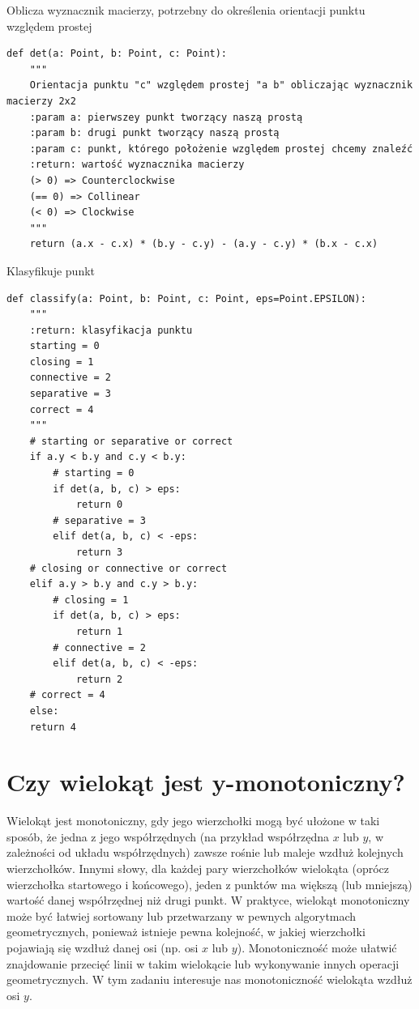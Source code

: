 \documentclass[12pt]{article}
\begin{document}
\newpage

\mbox{}
\par Oblicza wyznacznik macierzy, potrzebny do określenia orientacji punktu względem prostej
\begin{Verbatim}
def det(a: Point, b: Point, c: Point):
	"""
	Orientacja punktu "c" względem prostej "a b" obliczając wyznacznik macierzy 2x2
	:param a: pierwszey punkt tworzący naszą prostą
	:param b: drugi punkt tworzący naszą prostą
	:param c: punkt, którego położenie względem prostej chcemy znaleźć
	:return: wartość wyznacznika macierzy
	(> 0) => Counterclockwise
	(== 0) => Collinear
	(< 0) => Clockwise
	"""
	return (a.x - c.x) * (b.y - c.y) - (a.y - c.y) * (b.x - c.x)
\end{Verbatim}

\mbox{}
\par Klasyfikuje punkt
\begin{Verbatim}
def classify(a: Point, b: Point, c: Point, eps=Point.EPSILON):
	"""
	:return: klasyfikacja punktu
	starting = 0
	closing = 1
	connective = 2
	separative = 3
	correct = 4
	"""
	# starting or separative or correct
	if a.y < b.y and c.y < b.y:
		# starting = 0
		if det(a, b, c) > eps:
			return 0
		# separative = 3
		elif det(a, b, c) < -eps:
			return 3
	# closing or connective or correct
	elif a.y > b.y and c.y > b.y:
		# closing = 1
		if det(a, b, c) > eps:
			return 1
		# connective = 2
		elif det(a, b, c) < -eps:
			return 2
	# correct = 4
	else:
	return 4
\end{Verbatim}

\newpage

\section*{Czy wielokąt jest y-monotoniczny?}
\par 
Wielokąt jest monotoniczny, gdy jego wierzchołki mogą być ułożone w taki sposób, że jedna z jego współrzędnych (na przykład współrzędna $x$ lub $y$, w zależności od układu współrzędnych) zawsze rośnie lub maleje wzdłuż kolejnych wierzchołków. Innymi słowy, dla każdej pary wierzchołków wielokąta (oprócz wierzchołka startowego i końcowego), jeden z punktów ma większą (lub mniejszą) wartość danej współrzędnej niż drugi punkt.
\newline\newline
W praktyce, wielokąt monotoniczny może być łatwiej sortowany lub przetwarzany w pewnych algorytmach geometrycznych, ponieważ istnieje pewna kolejność, w jakiej wierzchołki pojawiają się wzdłuż danej osi (np. osi $x$ lub $y$). Monotoniczność może ułatwić znajdowanie przecięć linii w takim wielokącie lub wykonywanie innych operacji geometrycznych. W tym zadaniu interesuje nas monotoniczność wielokąta wzdłuż osi $y$.
\end{document}
